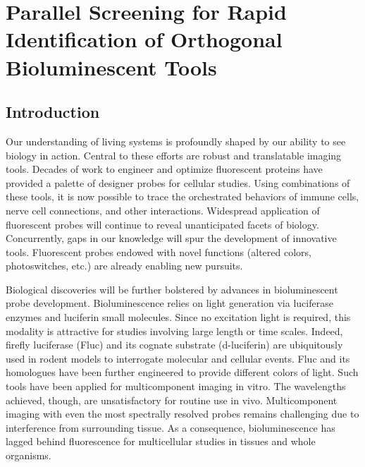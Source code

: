 
\chapter{Parallel Screening for Rapid Identification of Orthogonal Bioluminescent Tools}
\label{chap:parallel}
\section{Introduction}
Our understanding of living systems is profoundly shaped by our ability to see biology in action. Central to these efforts are robust and translatable imaging tools.\cite{Specht:2017et,Lavis:2014jx} Decades of work to engineer and optimize fluorescent proteins have provided a palette of designer probes for cellular studies. Using combinations of these tools, it is now possible to trace the orchestrated behaviors of immune cells,\cite{Germain:2012ip} nerve cell connections,\cite{Cai:2013dy} and other interactions.\cite{Porterfield:2015bu} Widespread application of fluorescent probes will continue to reveal unanticipated facets of biology. Concurrently, gaps in our knowledge will spur the development of innovative tools. Fluorescent probes endowed with novel functions (altered colors, photoswitches, etc.) are already enabling new pursuits.\cite{Rodriguez:2017ju,Betzig:2006hx}
\par
Biological discoveries will be further bolstered by advances in bioluminescent probe development. Bioluminescence relies on light generation via luciferase enzymes and luciferin small molecules.\cite{Prescher:2010dv,Branchini:2015epa} Since no excitation light is required, this modality is attractive for studies involving large length or time scales.\cite{Zhao:2005if,Rumyantsev:2016fd,Troy:2004bda} Indeed, firefly luciferase (Fluc) and its cognate substrate (d-luciferin) are ubiquitously used in rodent models to interrogate molecular and cellular events.\cite{Adams:2014jsb,Xu:2016et} Fluc and its homologues have been further engineered to provide different colors of light.\cite{Branchini:2007fz,Nakatsu:2006esa} Such tools have been applied for multicomponent imaging in vitro. The wavelengths achieved, though, are unsatisfactory for routine use in vivo. Multicomponent imaging with even the most spectrally resolved probes remains challenging due to interference from surrounding tissue.\cite{Zhao:2005if} As a consequence, bioluminescence has lagged behind fluorescence for multicellular studies in tissues and whole organisms.
\par
